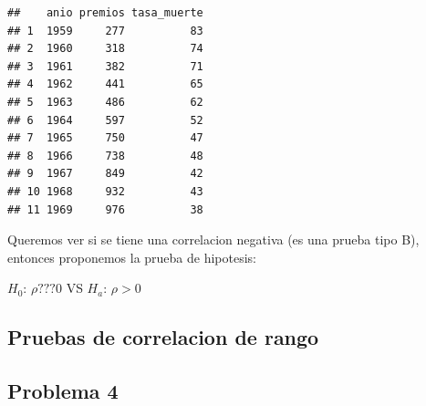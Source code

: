 \documentclass[
]{article}
\begin{document}
\begin{verbatim}
##    anio premios tasa_muerte
## 1  1959     277          83
## 2  1960     318          74
## 3  1961     382          71
## 4  1962     441          65
## 5  1963     486          62
## 6  1964     597          52
## 7  1965     750          47
## 8  1966     738          48
## 9  1967     849          42
## 10 1968     932          43
## 11 1969     976          38
\end{verbatim}

Queremos ver si se tiene una correlacion negativa (es una prueba tipo
B), entonces proponemos la prueba de hipotesis:

\(H_{0}\): \(\rho ???0\) VS \(H_{a}\): \(\rho>0\)

\hypertarget{pruebas-de-correlacion-de-rango-1}{%
\subsection{Pruebas de correlacion de
rango}\label{pruebas-de-correlacion-de-rango-1}}

\hypertarget{problema-4-1}{%
\subsection{Problema 4}\label{problema-4-1}}
\end{document}
